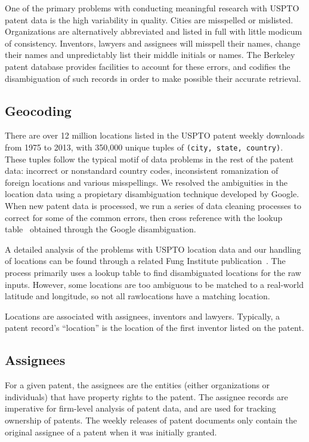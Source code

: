One of the primary problems with conducting meaningful research with
USPTO patent data is the high variability in quality. Cities are misspelled
or mislisted. Organizations are alternatively abbreviated and listed
in full with little modicum of consistency. Inventors, lawyers and
assignees will misspell their names, change their names and unpredictably
list their middle initials or names. The Berkeley patent database
provides facilities to account for these errors, and codifies the
disambiguation of such records in order to make possible their accurate
retrieval.


\subsection{Geocoding}

There are over 12 million locations listed in the USPTO patent weekly
downloads from 1975 to 2013, with 350,000 unique tuples of \verb`(city, state, country)`.
These tuples follow the typical motif of data problems in the rest
of the patent data: incorrect or nonstandard country codes, inconsistent
romanization of foreign locations and various misspellings. We resolved
the ambiguities in the location data using a propietary disambiguation
technique developed by Google. When new patent data is processed,
we run a series of data cleaning processes to correct for some of
the common errors, then cross reference with the lookup table~\cite{geotable}
obtained through the Google disambiguation. 

A detailed analysis of the problems with USPTO location data and our
handling of locations can be found through a related Fung Institute
publication~\cite{geocoding}. The process primarily uses a lookup table
to find disambiguated locations for the raw inputs. However, some locations are
too ambiguous to be matched to a real-world latitude and longitude, so not all
rawlocations have a matching location. 

Locations are associated with assignees, inventors and lawyers. Typically,
a patent record's ``location'' is the location of the first inventor
listed on the patent.


\subsection{Assignees}

For a given patent, the assignees are the entities (either organizations
or individuals) that have property rights to the patent. The assignee
records are imperative for firm-level analysis of patent data, and
are used for tracking ownership of patents. The weekly releases of
patent documents only contain the original assignee of a patent when
it was initially granted.

